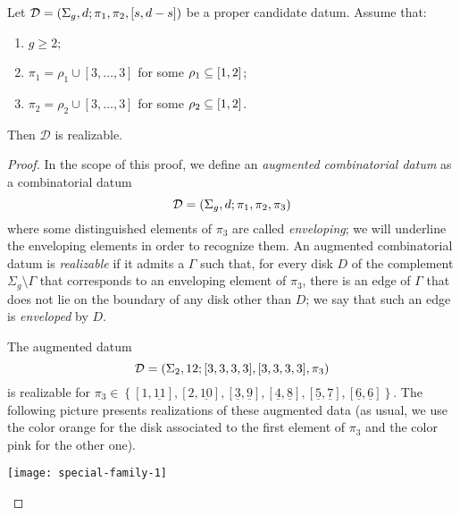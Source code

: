 \documentclass{article}
\begin{document}
\begin{lemma}\label{th:exceptional-n3-special-family}
Let $\mathcal{D}=\left(\Sigma_g,d;\pi_1,\pi_2,[s,d-s]\right)$ be a proper candidate datum. Assume that:
\begin{enumerate}
\item $g\ge 2$;
\item $\pi_1=\rho_1\cup[3,\ldots,3]$ for some $\rho_1\subseteq[1,2]$;
\item $\pi_2=\rho_2\cup[3,\ldots,3]$ for some $\rho_2\subseteq[1,2]$.
\end{enumerate}
Then $\mathcal{D}$ is realizable.
\end{lemma}
\begin{proof}
\newcommand{\env}[1]{\underline{#1}}
In the scope of this proof, we define an \emph{augmented combinatorial datum} as a combinatorial datum
\[
\mathcal{D}=\left(\Sigma_g,d;\pi_1,\pi_2,\pi_3\right)
\]
where some distinguished elements of $\pi_3$ are called \emph{enveloping}; we will underline the enveloping elements in order to recognize them. An augmented combinatorial datum is \emph{realizable} if it admits a \dessin{} $\Gamma$ such that, for every disk $D$ of the complement $\Sigma_g\setminus\Gamma$ that corresponds to an enveloping element of $\pi_3$, there is an edge of $\Gamma$ that does not lie on the boundary of any disk other than $D$; we say that such an edge is \emph{enveloped} by $D$.
\begin{manycases}
\case The augmented datum
\[
\mathcal{D}=\left(\Sigma_2,12;[3,3,3,3],[3,3,3,3],\pi_3\right)
\]
is realizable for $\pi_3\in\left\{[1,\env{11}],[2,\env{10}],[\env{3},\env{9}],[\env{4},\env{8}],[\env{5},\env{7}],[\env{6},\env{6}]\right\}$. The following picture presents realizations of these augmented data (as usual, we use the color orange for the disk associated to the first element of $\pi_3$ and the color pink for the other one).
\begin{center}
\texttt{[image: special-family-1]}
\end{center}


\end{manycases}
\end{proof}
\end{document}
